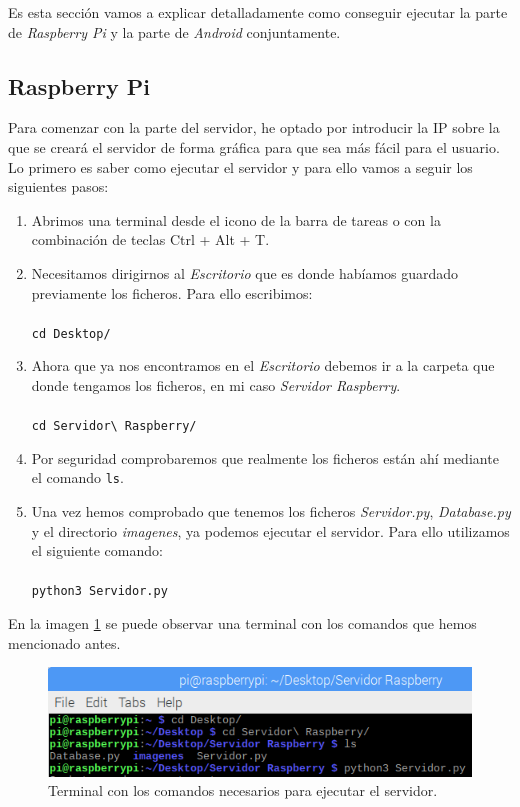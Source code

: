 Es esta sección vamos a explicar detalladamente como conseguir ejecutar la parte de \textit{Raspberry Pi} y la parte de \textit{Android} conjuntamente.

\subsection{Raspberry Pi}\label{sec:ejecuciónRaspberry}

Para comenzar con la parte del servidor, he optado por introducir la IP sobre la que se creará el servidor de forma gráfica para que sea más fácil para el usuario. Lo primero es saber como ejecutar el servidor y para ello vamos a seguir los siguientes pasos:

\begin{enumerate}
	\item Abrimos una terminal desde el icono de la barra de tareas o con la combinación de teclas Ctrl + Alt + T.
	\item Necesitamos dirigirnos al \textit{Escritorio} que es donde habíamos guardado previamente los ficheros. Para ello escribimos: \\ \\
	\verb|cd Desktop/|
	\item Ahora que ya nos encontramos en el \textit{Escritorio} debemos ir a la carpeta que donde tengamos los ficheros, en mi caso \textit{Servidor Raspberry}.\\ \\
	\verb|cd Servidor\ Raspberry/|
	\item Por seguridad comprobaremos que realmente los ficheros están ahí mediante el comando \verb|ls|.
	\item Una vez hemos comprobado que tenemos los ficheros \textit{Servidor.py}, \textit{Database.py} y el directorio \textit{imagenes}, ya podemos ejecutar el servidor. Para ello utilizamos el siguiente comando:\\\\
	\verb|python3 Servidor.py|
\end{enumerate}

En la imagen \ref{fig:terminal} se puede observar una terminal con los comandos que hemos mencionado antes.

\begin{figure}[h!]
	\centering
	\includegraphics[width=0.9\linewidth]{img/terminal}
	\caption{Terminal con los comandos necesarios para ejecutar el servidor.}
	\label{fig:terminal}
\end{figure}

